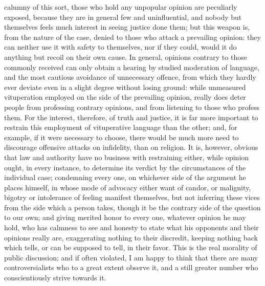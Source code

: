 \documentclass[12pt]{report}
\begin{document}
calumny of this sort, those who hold any unpopular opinion are peculiarly exposed, because they are in general few and uninfluential, and nobody but themselves feels much interest in seeing justice done them; but this weapon is, from the nature of the case, denied to those who attack a prevailing opinion: they can neither use it with safety to themselves, nor if they could, would it do anything but recoil on their own cause. In general, opinions contrary to those commonly received can only obtain a hearing by studied moderation of language, and the most cautious avoidance of unnecessary offence, from which they hardly ever deviate even in a slight degree without losing ground: while unmeasured vituperation employed on the side of the prevailing opinion, really does deter people from professing contrary opinions, and from listening to those who profess them. For the interest, therefore, of truth and justice, it is far more important to restrain this employment of vituperative language than the other; and, for example, if it were necessary to choose, there would be much more need to discourage offensive attacks on infidelity, than on religion. It is, however, obvious that law and authority have no business with restraining either, while opinion ought, in every instance, to determine its verdict by the circumstances of the individual case; condemning every one, on whichever side of the argument he places himself, in whose mode of advocacy either want of candor, or malignity, bigotry or intolerance of feeling manifest themselves, but not inferring these vices from the side which a person takes, though it be the contrary side of the question to our own; and giving merited honor to every one, whatever opinion he may hold, who has calmness to see and honesty to state what his opponents and their opinions really are, exaggerating nothing to their discredit, keeping nothing back which tells, or can be supposed to tell, in their favor. This is the real morality of public discussion; and if often violated, I am happy to think that there are many controversialists who to a great extent observe it, and a still greater number who conscientiously strive towards it.
\end{document}
